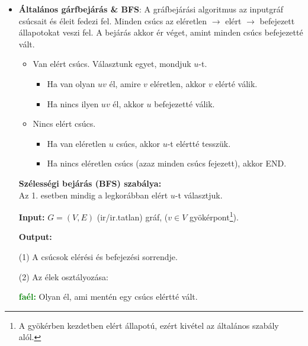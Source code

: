 \documentclass[../../szobeli.tex]{subfiles}
\begin{document}
\begin{center}
    \noindent{}
\end{center}
    \begin{itemize}
        \item \textbf{Általános gárfbejárás \& BFS}: A gráfbejárási algoritmus az inputgráf csúcsait és éleit fedezi fel. Minden csúcs az eléretlen $\rightarrow$ elért $\rightarrow$ befejezett állapotokat veszi fel. A bejárás akkor ér véget, amint minden csúcs befejezetté vált. \begin{itemize}
            \item[1.] Van elért csúcs. Választunk egyet, mondjuk $u$-t. \begin{itemize}
                \item[(1a)] Ha van olyan $uv$ él, amire $v$ eléretlen, akkor $v$ elérté válik.
                \item[(1b)] Ha nincs ilyen $uv$ él, akkor $u$ befejezetté válik.
            \end{itemize}
            \item[2.] Nincs elért csúcs. \begin{itemize}
                \item[(2a)] Ha van eléretlen $u$ csúcs, akkor $u$-t elértté tesszük.
                \item[(2b)] Ha nincs eléretlen csúcs (azaz minden csúcs fejezett), akkor END.
            \end{itemize} 
        \end{itemize}

        \textbf{Szélességi bejárás (BFS) szabálya:} \\Az 1. esetben mindig a legkorábban elért $u$-t választjuk.

        \textbf{Input:} $G = (V,E)$ (ir/ir.tatlan) gráf, ($v \in V$ gyökérpont\footnote{A gyökérben kezdetben elért állapotú, ezért kivétel az általános szabály alól.}).

			\textbf{Output:} 
            
            (1) A csúcsok elérési és befejezési sorrendje. 
            
            (2) Az élek osztályozása:

			\textbf{\textcolor{green}{faél:}} Olyan él, ami mentén egy csúcs elértté vált.


\end{itemize}
\end{document}
